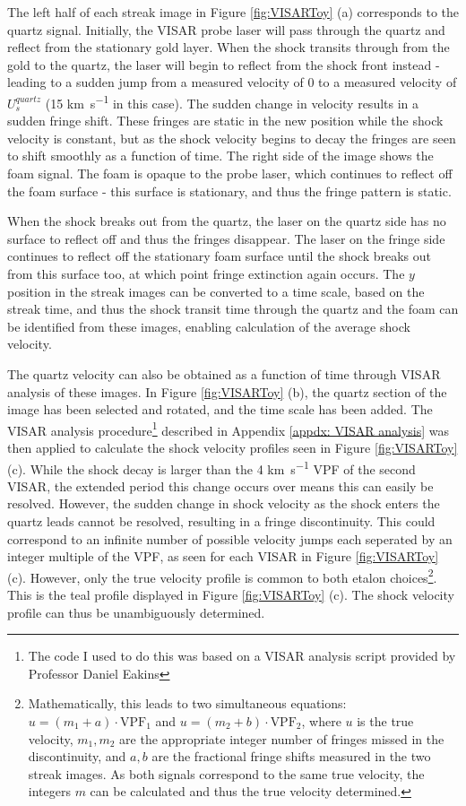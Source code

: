 The left half of each streak image in Figure \ref{fig:VISARToy} (a) corresponds to the quartz signal. Initially, the VISAR probe laser will pass through the quartz and reflect from the stationary gold layer. When the shock transits through from the gold to the quartz, the laser will begin to reflect from the shock front instead - leading to a sudden jump from a measured velocity of 0 to a measured velocity of $U_{s}^{quartz}$ (15 \unit{\kilo\meter\per\second} in this case). The sudden change in velocity results in a sudden fringe shift. These fringes are static in the new position while the shock velocity is constant, but as the shock velocity begins to decay the fringes are seen to shift smoothly as a function of time. The right side of the image shows the foam signal. The foam is opaque to the probe laser, which continues to reflect off the foam surface - this surface is stationary, and thus the fringe pattern is static.

When the shock breaks out from the quartz, the laser on the quartz side has no surface to reflect off and thus the fringes disappear. The laser on the fringe side continues to reflect off the stationary foam surface until the shock breaks out from this surface too, at which point fringe extinction again occurs. The $y$ position in the streak images can be converted to a time scale, based on the streak time, and thus the shock transit time through the quartz and the foam can be identified from these images, enabling calculation of the average shock velocity.

The quartz velocity can also be obtained as a function of time through VISAR analysis of these images. In Figure \ref{fig:VISARToy} (b), the quartz section of the image has been selected and rotated, and the time scale has been added. The VISAR analysis procedure\footnote{The code I used to do this was based on a VISAR analysis script provided by Professor Daniel Eakins} described in Appendix \ref{appdx: VISAR analysis} was then applied to calculate the shock velocity profiles seen in Figure \ref{fig:VISARToy} (c). While the shock decay is larger than the 4 \unit{\kilo\meter\per\second} VPF of the second VISAR, the extended period this change occurs over means this can easily be resolved. However, the sudden change in shock velocity as the shock enters the quartz leads cannot be resolved, resulting in a fringe discontinuity. This could correspond to an infinite number of possible velocity jumps each seperated by an integer multiple of the VPF, as seen for each VISAR in Figure \ref{fig:VISARToy} (c). However, only the true velocity profile is common to both etalon choices\footnote{Mathematically, this leads to two simultaneous equations: $u = (m_1 + a) \cdot \textrm{VPF}_1$ and $u = (m_2 + b) \cdot \textrm{VPF}_2$, where $u$ is the true velocity, $m_1, m_2$ are the appropriate integer number of fringes missed in the discontinuity, and $a,b$ are the fractional fringe shifts measured in the two streak images. As both signals correspond to the same true velocity, the integers $m$ can be calculated and thus the true velocity determined.}. This is the teal profile displayed in Figure \ref{fig:VISARToy} (c). The shock velocity profile can thus be unambiguously determined.




